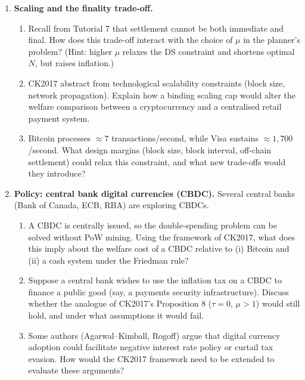 \documentclass[11pt]{article}
\begin{document}
\begin{enumerate}
\item \textbf{Scaling and the finality trade-off.}
\begin{enumerate}
    \item Recall from Tutorial 7 that settlement cannot be both immediate and final. How does
          this trade-off interact with the choice of $\mu$ in the planner's problem?
          (Hint: higher $\mu$ relaxes the DS constraint and shortens optimal $N$, but raises
          inflation.)
    \item CK2017 abstract from technological scalability constraints (block size, network
          propagation). Explain how a binding scaling cap would alter the welfare comparison
          between a cryptocurrency and a centralised retail payment system.
    \item Bitcoin processes $\approx 7$ transactions/second, while Visa sustains $\approx 1{,}700$/second.
          What design margins (block size, block interval, off-chain settlement) could relax
          this constraint, and what new trade-offs would they introduce?
\end{enumerate}

\item \textbf{Policy: central bank digital currencies (CBDC).}
Several central banks (Bank of Canada, ECB, RBA) are exploring CBDCs.
\begin{enumerate}
    \item A CBDC is centrally issued, so the double-spending problem can be solved without PoW
          mining. Using the framework of CK2017, what does this imply about the welfare cost of
          a CBDC relative to (i) Bitcoin and (ii) a cash system under the Friedman rule?
    \item Suppose a central bank wishes to use the inflation tax on a CBDC to finance a public
          good (say, a payments security infrastructure). Discuss whether the analogue of CK2017's
          Proposition 8 ($\tau=0$, $\mu>1$) would still hold, and under what assumptions it would
          fail.
    \item Some authors (Agarwal--Kimball, Rogoff) argue that digital currency adoption could
          facilitate negative interest rate policy or curtail tax evasion. How would the
          CK2017 framework need to be extended to evaluate these arguments?
\end{enumerate}

\end{enumerate}
\end{document}

